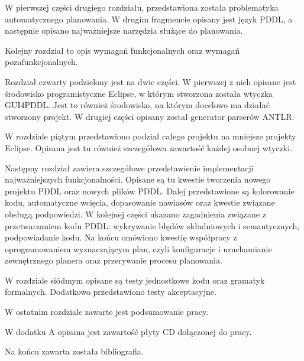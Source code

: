 W pierwszej części drugiego rozdziału, przedstawiona została problematyka automatycznego planowania. W drugim fragmencie opisany jest język PDDL, a następnie opisano najważniejsze narzędzia służące do planowania.

Kolejny rozdział to opis wymagań funkcjonalnych oraz wymagań pozafunkcjonalnych.

Rozdział czwarty podzielony jest na dwie części. W pierwszej z nich opisane jest środowisko programistyczne Eclipse, w którym stworzona została wtyczka GUI4PDDL. Jest to również środowisko, na którym docelowo ma działać stworzony projekt. W drugiej części opisany został generator parserów ANTLR.

W rozdziale piątym przedstawiono podział całego projektu na mniejsze projekty Eclipse. Opisana jest tu również szczegółowa zawartość każdej osobnej wtyczki.

Następny rozdział zawiera szczegółowe przedstawienie implementacji najważniejszych funkcjonalności. Opisane są tu kwestie tworzenia nowego projektu PDDL oraz nowych plików PDDL. Dalej przedstawione są kolorowanie kodu, automatyczne wcięcia, dopasowanie nawiasów oraz kwestie związane obsługą podpowiedzi. W kolejnej części ukazano zagadnienia związane z przetwarzaniem kodu PDDL: wykrywanie błędów składniowych i semantycznych, podpowiadanie kodu. Na końcu omówiono kwestię współpracy z oprogramowaniem wyznaczającym plan, czyli konfiguracje i uruchamianie zewnętrznego planera oraz przerywanie procesu planowania.

W rozdziale siódmym opisane są testy jednostkowe kodu oraz gramatyk formalnych. Dodatkowo przedstawiono testy akceptacyjne.

W ostatnim rozdziale zawarte jest podsumowanie pracy.

W dodatku A opisana jest zawartość płyty CD dołączonej do pracy.

Na końcu zawarta została bibliografia.
